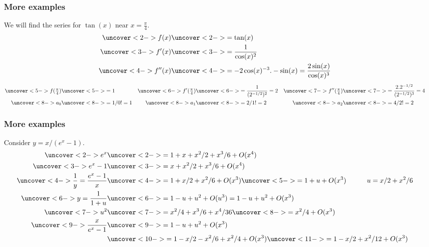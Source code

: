 \documentclass[9pt]{beamer}
\begin{document}
\begin{frame}[t]
 \frametitle{More examples}
 We will find the series for $\tan(x)$ near $x=\tfrac{\pi}{4}$.
 \begin{align*}
  \uncover<2->{f(x)} &\uncover<2->{=\tan(x)} \\
  \uncover<3->{f'(x)} &\uncover<3->{= \frac{1}{\cos(x)^2}} \\
  \uncover<4->{f''(x)} &\uncover<4->{=-2\cos(x)^{-3}.-\sin(x) 
   =\frac{2\sin(x)}{\cos(x)^3}}
 \end{align*}
 \begin{align*}
  \uncover<5->{f(\tfrac{\pi}{4})} &\uncover<5->{= 1} &
  \uncover<6->{f'(\tfrac{\pi}{4})} &\uncover<6->{= \frac{1}{(2^{-1/2})^2} = 2} &
  \uncover<7->{f''(\tfrac{\pi}{4})} &\uncover<7->{= \frac{2.2^{-1/2}}{(2^{-1/2})^3} = 4} \\
  \uncover<8->{a_0} &\uncover<8->{= 1/0!=1} & 
  \uncover<8->{a_1} &\uncover<8->{= 2/1!=2} &
  \uncover<8->{a_2} &\uncover<8->{= 4/2!=2}
 \end{align*}
\end{frame}

\begin{frame}[t]
 \frametitle{More examples}
 Consider $y=x/(e^x-1)$.
 \begin{align*}
  \uncover<2->{e^x} &\uncover<2->{= 1 + x + x^2/2 + x^3/6 + O(x^4)} \\
  \uncover<3->{e^x - 1} &\uncover<3->{= x + x^2/2 + x^3/6 + O(x^4)} \\
  \uncover<4->{\frac{1}{y}=\frac{e^x-1}{x}} &
  \uncover<4->{= 1 + x/2 + x^2/6 + O(x^3)}\uncover<5->{ = 1 + u + O(x^3)
   \hspace{3em} u = x/2 + x^2/6} \\
  \uncover<6->{y=\frac{1}{1+u}} &
  \uncover<6->{= 1 - u + u^2 + O(u^3) = 1 - u + u^2 + O(x^3)} \\
  \uncover<7->{u^2} &\uncover<7->{= x^2/4 + x^3/6 + x^4/36}\uncover<8->{ = x^2/4 + O(x^3)} \\
  \uncover<9->{\frac{x}{e^x-1}} &\uncover<9->{= 1-u+u^2 + O(x^3)} \\
  &\uncover<10->{= 1-x/2-x^2/6+x^2/4 + O(x^3)}\uncover<11->{ = 1-x/2+x^2/12 + O(x^3)}
 \end{align*}
\end{frame}
\end{document}
